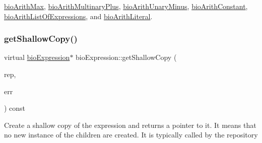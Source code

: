 \hyperlink{classbio_arith_max_a0d4f43812301caafd039e446bbd22bb7}{bio\+Arith\+Max}, \hyperlink{classbio_arith_multinary_plus_ac43848551e8c792e9776b7a5e8aef51b}{bio\+Arith\+Multinary\+Plus}, \hyperlink{classbio_arith_unary_minus_a59b3bcf198b25bc802775014bfce2f21}{bio\+Arith\+Unary\+Minus}, \hyperlink{classbio_arith_constant_a13a6799f54ffbbc8b43d54b213888fe0}{bio\+Arith\+Constant}, \hyperlink{classbio_arith_list_of_expressions_af0c6e016d69454ac0b7d4f889190807e}{bio\+Arith\+List\+Of\+Expressions}, and \hyperlink{classbio_arith_literal_a0cdf0cb347fbf2b6db50b31ef8824d9c}{bio\+Arith\+Literal}.

\mbox{\label{classbio_expression_a442534762693b92baaf33928979a1bf8}} 
\subsubsection{\texorpdfstring{get\+Shallow\+Copy()}{getShallowCopy()}}
{\footnotesize\ttfamily virtual \hyperlink{classbio_expression}{bio\+Expression}$\ast$ bio\+Expression\+::get\+Shallow\+Copy (\begin{DoxyParamCaption}\item[{\hyperlink{classbio_expression_repository}{bio\+Expression\+Repository} $\ast$}]{rep,  }\item[{pat\+Error $\ast$\&}]{err }\end{DoxyParamCaption}) const\hspace{0.3cm}{\ttfamily [virtual]}}

Create a shallow copy of the expression and returns a pointer to it. It means that no new instance of the children are created. It is typically called by the repository 

